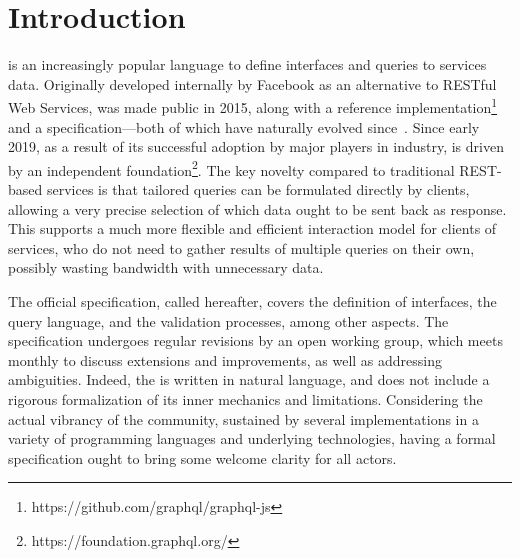 \section{Introduction}

\gql is an increasingly popular language to define interfaces and queries to services data. Originally developed internally by Facebook as an alternative to RESTful Web Services, \gql was made public in 2015, along with a reference implementation\footnote{https://github.com/graphql/graphql-js} and a specification---both of which have naturally evolved since~\cite{gqlspec}.%
Since early 2019, as a result of its successful adoption by major players in industry,
\gql is driven by an independent foundation\footnote{https://foundation.graphql.org/}. The key novelty compared to traditional REST-based services is that tailored queries can be formulated directly by clients, allowing a very precise selection of which data ought to be sent back as response. This supports a much more flexible and efficient interaction model for clients of services, who do not need to gather results of multiple queries on their own, possibly wasting bandwidth with unnecessary data.


The official \gql specification, called \spec hereafter, 
covers the definition of interfaces, the query language, and the validation processes, among other aspects. The specification undergoes regular revisions by an open working group, which meets monthly to discuss extensions and improvements, as well as addressing ambiguities. Indeed, the \spec is written in natural language, and does not include a rigorous formalization of  its inner mechanics and limitations.
Considering the actual vibrancy of the \gql community, sustained by several implementations in a variety of programming languages and underlying technologies, having a formal specification ought to bring some welcome clarity for all actors.

